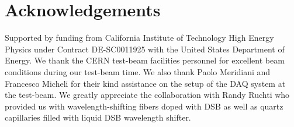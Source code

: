 \documentclass[preprint,1p]{elsarticle}
\begin{document}
\section{Acknowledgements} 
Supported by funding from California Institute of
Technology High Energy Physics under Contract DE-SC0011925 with the United
States Department of Energy. We thank the CERN test-beam facilities personnel for
excellent beam conditions during our test-beam time. We also thank Paolo
Meridiani and Francesco Micheli for their kind assistance on the setup of the
DAQ system at the test-beam. We greatly appreciate the collaboration with Randy
Ruchti who provided us with wavelength-shifting fibers doped with DSB as well as
quartz capillaries filled with liquid DSB wavelength shifter.
%
%


{}
 
\end{document}
